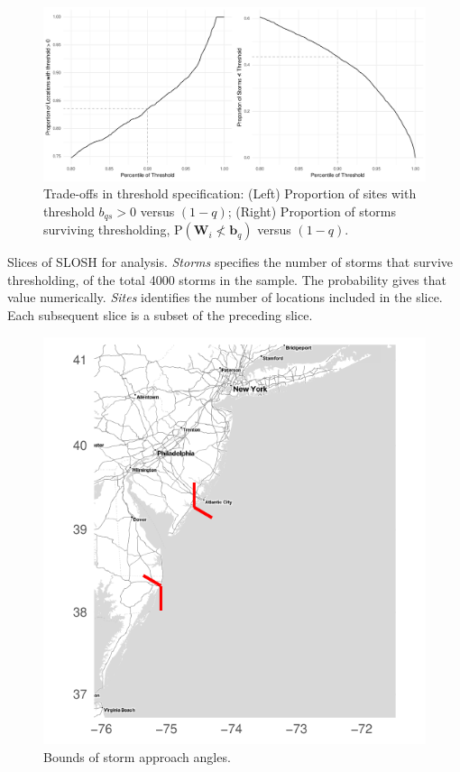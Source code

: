 \begin{figure}[ht]
    \centering
    \caption{Trade-offs in threshold specification:
    (Left) Proportion of sites with threshold $b_{qs} > 0$ versus $(1 - q)$; 
    (Right) Proportion of storms surviving thresholding, $\text{P}(\bm{W}_i \not< \bm{b}_q)$ versus $(1 - q)$.
    \label{fig:thresholdselection}}
    \includegraphics[width=0.7\linewidth]{plots/explore_threshold}
\end{figure}

\begin{table}[htb]
    \centering
    \caption{Slices of SLOSH for analysis.  \emph{Storms} specifies the number of storms that survive 
    thresholding, of the total \num{4000} storms in the sample.  The probability gives that value 
    numerically. \emph{Sites} identifies the number of locations included in the slice. Each 
    subsequent slice is a subset of the preceding slice.\label{tab:datasets}}
    
\end{table}

\begin{figure}[htb]
    \centering
    \caption{Bounds of storm approach angles.\label{fig:slosh_bounds}}
    \includegraphics{plots/slosh_bounds}
\end{figure}

